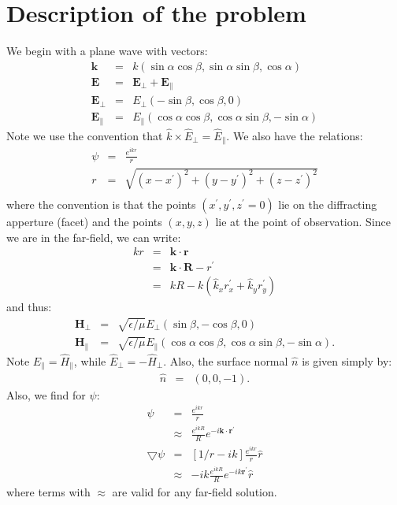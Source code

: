 \documentclass[a4article,12pt]{article}
\newcommand{\kvec}[0]{{\mathbf k}}
\newcommand{\rvecp}[0]{{\mathbf r}^{\prime}}
\begin{document}
\section{Description of the problem}

We begin with a plane wave with vectors:
%
\begin{eqnarray}
\mathbf{k} & = & k \left(\sin \alpha \cos \beta, \sin \alpha \sin \beta, \cos \alpha \right) \\
\mathbf{E} & = & \mathbf{E}_{\perp}+\mathbf{E}_{\parallel} \\
\mathbf{E}_{\perp} & = & E_{\perp} \left(- \sin \beta, \cos \beta, 0 \right) \\
\mathbf{E}_{\parallel} & = & E_{\parallel} \left(\cos \alpha \cos \beta, \cos \alpha \sin \beta, -\sin \alpha  \right)
\end{eqnarray}
%
Note we use the convention that $\hat{k} \times \hat{E}_{\perp} = \hat{E}_{\parallel}$. We also have the relations: 
%
\begin{eqnarray}
\psi & = & \frac{e^{i k r}}{r} \\
r & = & \sqrt{ (x-x^{\prime})^2+(y-y^{\prime})^2+(z-z^{\prime})^2} \\
\end{eqnarray}
%
where the convention is that the points $\left(x^{\prime}, y^{\prime}, z^{\prime}=0 \right)$ lie on the diffracting apperture (facet) and the points $\left(x,y,z\right)$ lie at the point of observation. Since we are in the far-field, we can write:
%
\begin{eqnarray}
k r & = & \kvec \cdot {\mathbf r} \\
& = & \kvec \cdot {\mathbf R - r^{\prime}} \\
& = & k R - k ( \hat{k}_x r_x^{\prime} + \hat{k}_y r_y^{\prime})
\end{eqnarray}
%
and thus:
%
\begin{eqnarray}
\mathbf{H}_{\perp} & = & \sqrt{\epsilon/\mu} E_{\perp} \left(\sin \beta, -\cos \beta, 0 \right) \\
\mathbf{H}_{\parallel} & = & \sqrt{\epsilon/\mu} E_{\parallel} \left(\cos \alpha \cos \beta, \cos \alpha \sin \beta, -\sin \alpha  \right).
\end{eqnarray}
%
Note $\hat{E}_{\parallel} = \hat{H}_{\parallel}$, while $\hat{E}_{\perp} = - \hat{H}_{\perp}$. Also, the surface normal $\hat{n}$ is given simply by:
%
\begin{eqnarray}
\hat{n} & = & \left( 0,0,-1 \right).
\end{eqnarray}
%
Also, we find for $\psi$:
%
\begin{eqnarray}
\psi & = & \frac{e^{i k r}}{r} \\
& \approx & \frac{e^{i k R}}{R} e^{-i \kvec \cdot {\mathbf r}^{\prime}} \\
\bigtriangledown \psi & = & [1/r - i k] \frac{e^{i k r}}{r} \hat{r} \\
& \approx & - i k \frac{e^{i k R}}{R} e^{-i k \rvecp} \hat{r} 
\end{eqnarray}
%
where terms with $\approx$ are valid for any far-field solution.
\end{document}
